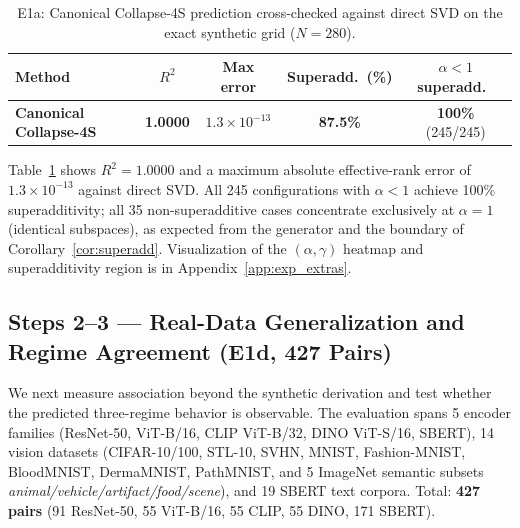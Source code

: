\documentclass{article}
\begin{document}
\begin{table}[t]
\centering
\caption{E1a: Canonical Collapse-4S prediction cross-checked against direct SVD on the exact synthetic grid ($N=280$).}
\label{tab:e1a}
\begin{tabular}{lcccc}
\toprule
Method & $R^2$ & Max error & Superadd.\ (\%) & $\alpha<1$ superadd.\ \\
\midrule
\textbf{Canonical Collapse-4S} & \textbf{1.0000} & \textbf{$1.3{\times}10^{-13}$} & \textbf{87.5\%} & \textbf{100\%} (245/245) \\
\bottomrule
\end{tabular}
\end{table}

Table~\ref{tab:e1a} shows $R^2{=}1.0000$ and a maximum absolute effective-rank
error of $1.3{\times}10^{-13}$ against direct SVD.
All 245 configurations with $\alpha{<}1$ achieve 100\% superadditivity;
all 35 non-superadditive cases concentrate exclusively at $\alpha{=}1$
(identical subspaces), as expected from the generator and the boundary of
Corollary~\ref{cor:superadd}.
Visualization of the $(\alpha,\gamma)$ heatmap and superadditivity region
is in Appendix~\ref{app:exp_extras}.

\subsection{Steps 2--3 --- Real-Data Generalization and Regime Agreement (E1d, 427 Pairs)}
\label{sec:e1d}

We next measure association beyond the synthetic derivation and test whether
the predicted three-regime behavior is observable.
The evaluation spans
5 encoder families (ResNet-50, ViT-B/16, CLIP ViT-B/32, DINO ViT-S/16, SBERT),
14 vision datasets (CIFAR-10/100, STL-10, SVHN, MNIST, Fashion-MNIST,
BloodMNIST, DermaMNIST, PathMNIST, and 5 ImageNet semantic subsets
\emph{animal/vehicle/artifact/food/scene}),
and 19 SBERT text corpora.
Total: \textbf{427 pairs} (91 ResNet-50, 55 ViT-B/16, 55 CLIP, 55 DINO, 171 SBERT).
\end{document}
